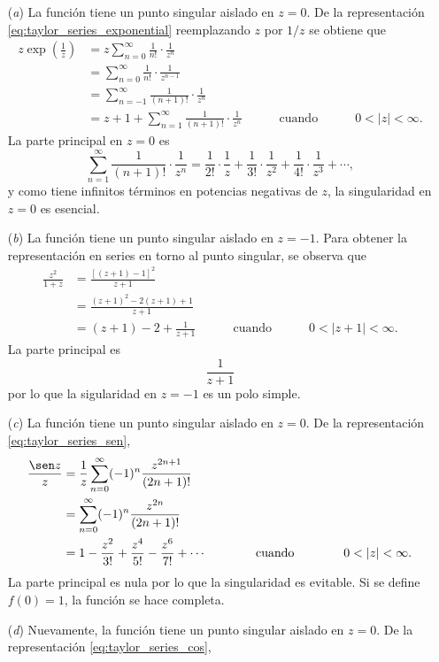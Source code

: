 \documentclass[a4paper]{report}
\begin{document}
\begin{enumerate}
 \item[(\textit{a})] La función tiene un punto singular aislado en \(z=0\). De la representación \ref{eq:taylor_series_exponential} reemplazando \(z\) por \(1/z\) se obtiene que 
 \begin{align*}
  z\exp\left(\frac{1}{z}\right)&=z\sum_{n=0}^\infty\frac{1}{n!}\cdot\frac{1}{z^n}\\
   &=\sum_{n=0}^\infty\frac{1}{n!}\cdot\frac{1}{z^{n-1}}\\
   &=\sum_{n=-1}^\infty\frac{1}{(n+1)!}\cdot\frac{1}{z^n}\\
   &=z+1+\sum_{n=1}^\infty\frac{1}{(n+1)!}\cdot\frac{1}{z^n}
   \qquad\quad\textrm{cuando}\quad\qquad
   0<|z|<\infty.
 \end{align*}
 La parte principal en \(z=0\) es
 \[
  \sum_{n=1}^\infty\frac{1}{(n+1)!}\cdot\frac{1}{z^n}=\frac{1}{2!}\cdot\frac{1}{z}+\frac{1}{3!}\cdot\frac{1}{z^2}+\frac{1}{4!}\cdot\frac{1}{z^3}+\cdots,
 \]
 y como tiene infinitos términos en potencias negativas de \(z\), la singularidad en \(z=0\) es esencial.
 \item[(\textit{b})] La función tiene un punto singular aislado en \(z=-1\). Para obtener la representación en series en torno al punto singular, se observa que 
 \begin{align*}
  \frac{z^2}{1+z}&=\frac{[(z+1)-1]^2}{z+1}\\  
   &=\frac{(z+1)^2-2(z+1)+1}{z+1}\\
   &=(z+1)-2+\frac{1}{z+1}
   \qquad\quad\textrm{cuando}\quad\qquad
   0<|z+1|<\infty.
 \end{align*}
 La parte principal es
 \[
  \frac{1}{z+1}
 \]
 por lo que la sigularidad en \(z=-1\) es un polo simple.
 \item[(\textit{c})] La función tiene un punto singular aislado en \(z=0\). De la representación \ref{eq:taylor_series_sen},
 \begin{align*}
  \frac{\sen z}{z}&=\frac{1}{z}\sum_{n=0}^\infty(-1)^n\frac{z^{2n+1}}{(2n+1)!}\\
    &=\sum_{n=0}^\infty(-1)^n\frac{z^{2n}}{(2n+1)!}\\
    &=1-\frac{z^2}{3!}+\frac{z^4}{5!}-\frac{z^6}{7!}+\cdots
 \qquad\qquad\textrm{cuando}\qquad\qquad
 0<|z|<\infty.
 \end{align*}
 La parte principal es nula por lo que la singularidad es evitable. Si se define \(f(0)=1\), la función se hace completa.
 \item[(\textit{d})] Nuevamente, la función tiene un punto singular aislado en \(z=0\). De la representación \ref{eq:taylor_series_cos},

\end{enumerate}
\end{document}
